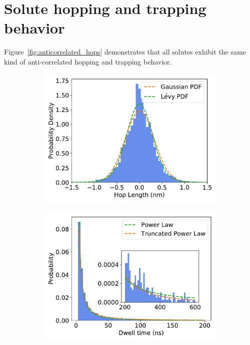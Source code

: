\documentclass{article}
\begin{document}
  \newpage
  
  \section{Solute hopping and trapping behavior}\label{section:sfbm_other_solutes}
  
  Figure~\ref{fig:anticorrelated_hops} demonstrates that all solutes exhibit the
  same kind of anti-correlated hopping and trapping behavior.
%  
  \begin{figure}[htb!]
  \centering
  \begin{subfigure}{0.3\textwidth}
  \includegraphics[width=\textwidth]{gaussian_levy_comparison_anomalous_URE.pdf}
  \caption{}\label{fig:URE_hop_distribution_comparison}
  \end{subfigure}
  \begin{subfigure}{0.3\textwidth}
  \includegraphics[width=\textwidth]{URE_powerlaw.pdf}

\end{subfigure}
\end{figure}
\end{document}
